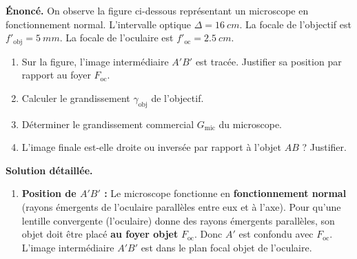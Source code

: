 \documentclass[11pt]{article}
\begin{document}
\begin{exoresolu}
\textbf{Énoncé.} On observe la figure ci-dessous représentant un microscope en fonctionnement normal. L'intervalle optique $\Delta = \SI{16}{cm}$. La focale de l'objectif est $f'_{\text{obj}} = \SI{5}{mm}$. La focale de l'oculaire est $f'_{\text{oc}} = \SI{2,5}{cm}$.
\begin{enumerate}
    \item Sur la figure, l'image intermédiaire $A'B'$ est tracée. Justifier sa position par rapport au foyer $F_{\text{oc}}$.
    \item Calculer le grandissement $\gamma_{\text{obj}}$ de l'objectif.
    \item Déterminer le grandissement commercial $G_{\text{mic}}$ du microscope.
    \item L'image finale est-elle droite ou inversée par rapport à l'objet $AB$ ? Justifier.
\end{enumerate}


\tcblower
\textbf{Solution détaillée.}
\begin{enumerate}
    \item \textbf{Position de $A'B'$ :} Le microscope fonctionne en \textbf{fonctionnement normal} (rayons émergents de l'oculaire parallèles entre eux et à l'axe). Pour qu'une lentille convergente (l'oculaire) donne des rayons émergents parallèles, son objet doit être placé \textbf{au foyer objet} $F_{\text{oc}}$. Donc $A'$ est confondu avec $F_{\text{oc}}$. L'image intermédiaire $A'B'$ est dans le plan focal objet de l'oculaire.
    

\end{enumerate}
\end{exoresolu}
\end{document}
